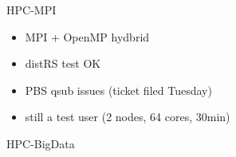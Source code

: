 \documentclass[serif,mathserif,aspectratio=169]{beamer}
\begin{document}
{
\begin{frame}[plain]
\begin{shaded}
\Huge HPC-MPI
\end{shaded}
\end{frame}}


\begin{frame}
\begin{center}
\begin{itemize}
 \item MPI + OpenMP hydbrid
 \item distRS test OK
 \item PBS qsub issues (ticket filed Tuesday)
 \item still a test user (2 nodes, 64 cores, 30min)
\end{itemize}
\end{center}
\end{frame}


{
\begin{frame}[plain]
\begin{shaded}
\Huge HPC-BigData
\end{shaded}
\end{frame}}
\end{document}
